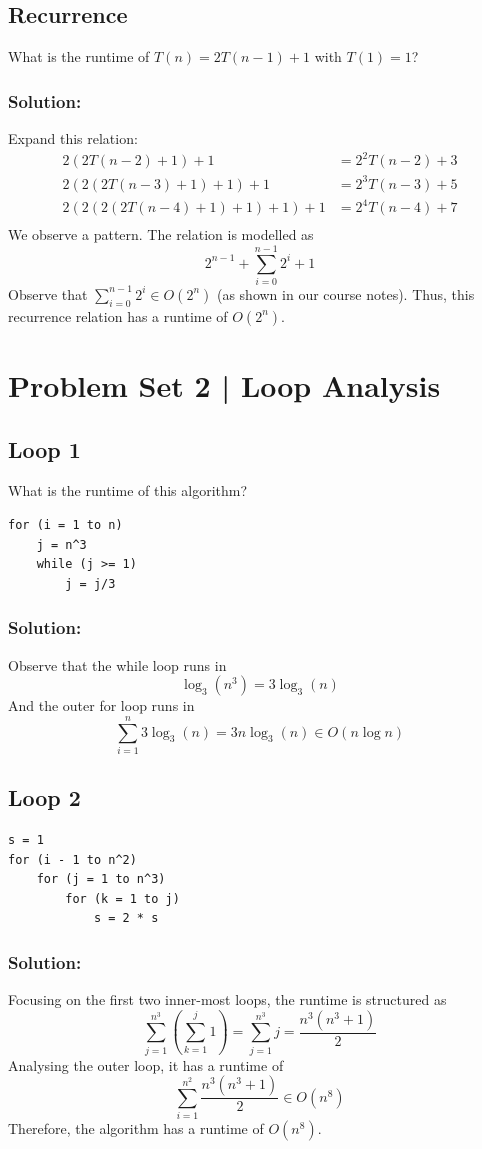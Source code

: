 \documentclass{report}
\begin{document}
\subsection{Recurrence}
What is the runtime of $T(n) = 2T(n-1) + 1$ with $T(1) = 1$?
\subsubsection{Solution:}
Expand this relation:
\begin{align*}
2(2T(n-2) + 1) + 1 &= 2^2 T(n-2) + 3 \\
2(2(2T(n-3) + 1) + 1) + 1 &= 2^3 T(n-3) + 5 \\ 
2(2(2(2T(n-4) + 1) + 1) + 1) + 1 &= 2^4 T(n-4) + 7 \\ 
\end{align*}
We observe a pattern. The relation is modelled as
$$2^{n-1} + \sum_{i=0}^{n-1} 2^i + 1$$
Observe that $\displaystyle \sum_{i=0}^{n-1} 2^i \in O(2^n)$ (as shown in our course notes). Thus, this recurrence relation has a runtime of $O(2^n)$.
\section*{Problem Set 2 | Loop Analysis}
\subsection{Loop 1}
What is the runtime of this algorithm?
\begin{lstlisting}
for (i = 1 to n)
	j = n^3
	while (j >= 1)
		j = j/3
\end{lstlisting}
\subsubsection{Solution:}
Observe that the while loop runs in $$\log_3(n^3) = 3\log_3(n)$$ And the outer for loop runs in
$$\sum_{i=1}^n 3\log_3(n) = 3n\log_3(n) \in O(n \log n)$$
\subsection{Loop 2}
\begin{lstlisting}
s = 1
for (i - 1 to n^2)
	for (j = 1 to n^3)
		for (k = 1 to j)
			s = 2 * s
\end{lstlisting}
\subsubsection{Solution:}
Focusing on the first two inner-most loops, the runtime is structured as
$$\sum_{j=1}^{n^3}\left(\sum_{k=1}^j 1\right) = \sum_{j=1}^{n^3} j = \frac{n^3(n^3 + 1)}{2}$$
Analysing the outer loop, it has a runtime of
$$\sum_{i=1}^{n^2} \frac{n^3(n^3 + 1)}{2} \in O(n^8) $$
Therefore, the algorithm has a runtime of $O(n^8)$.
\end{document}

